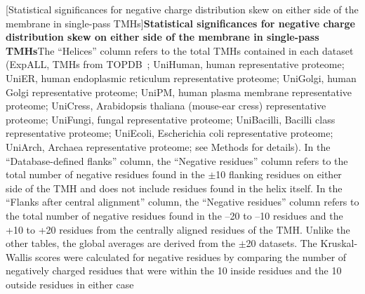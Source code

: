 \begin{table}[htbp!]

    \centering
    [Statistical significances for negative charge distribution skew on either side of the membrane in single-pass TMHs]{\textbf{Statistical significances for negative charge distribution skew on either side of the membrane in single-pass TMHs}The “Helices” column refers to the total TMHs contained in each dataset (ExpALL, TMHs from TOPDB~\cite{Dobson2015}; UniHuman, human representative proteome; UniER, human endoplasmic reticulum representative proteome; UniGolgi, human Golgi representative proteome; UniPM, human plasma membrane representative proteome; UniCress, Arabidopsis thaliana (mouse-ear cress) representative proteome; UniFungi, fungal representative proteome; UniBacilli, Bacilli class representative proteome; UniEcoli, Escherichia coli representative proteome; UniArch, Archaea representative proteome; see Methods for details).
In the “Database-defined flanks” column, the “Negative residues” column refers to the total number of negative residues found in the $\pm$10 flanking residues on either side of the TMH and does not include residues found in the helix itself.
In the ``Flanks after central alignment'' column, the ``Negative residues'' column refers to the total number of negative residues found in the –20 to –10 residues and the +10 to +20 residues from the centrally aligned residues of the TMH.
Unlike the other tables, the global averages are derived from the $\pm$20 datasets.
The Kruskal-Wallis scores were calculated for negative residues by comparing the number of negatively charged residues that were within the 10 inside residues and the 10 outside residues in either case}
\end{table}
